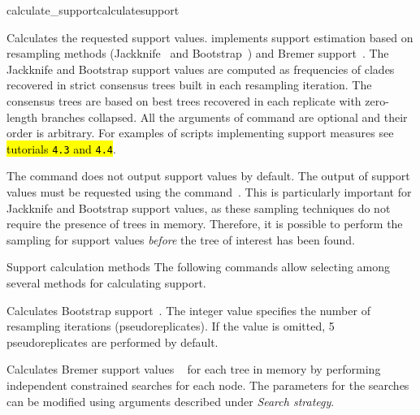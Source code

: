 \begin{command}{calculate\_support}{calculatesupport}


	\begin{poydescription} 
            Calculates the requested support values. \poy implements support
            estimation based on resampling methods (Jackknife~\cite{Farrisetal1996} 
            and Bootstrap~\cite{Felsenstein1985}) and Bremer support~\cite{Bremer1988, Kallersjoetal1992}. 
            The Jackknife and Bootstrap support values are computed as
            frequencies of clades recovered in strict consensus trees built in each resampling
            iteration. The consensus trees are based on best trees recovered in each replicate
            with zero-length branches collapsed.
            All the arguments of  command are optional and
            their order is arbitrary.  For examples of scripts implementing support measures see 
           \hl{ tutorials \texttt{4.3} and \texttt{4.4}}. 
            
	  The  command does not output support values by default. The output of
            support values must be requested using the command~. This is particularly important for Jackknife and Bootstrap support values, as these sampling techniques
            do not require the presence of trees in memory. Therefore, it is possible to perform the sampling for support values \emph{before}
            the tree of interest has been found.
                    \end{poydescription}
                    
              
	\begin{arguments}
		\begin{argumentgroup}{Support calculation methods}
            {The following commands allow selecting among several methods for
            calculating support.} 

                {Calculates Bootstrap support~\cite{Felsenstein1985}. 
                The integer value specifies
                the number of resampling iterations (pseudoreplicates). If the value
                is omitted, 5 pseudoreplicates are performed by default.} 
                {}
                
                {Calculates Bremer support values ~\cite{Bremer1988, Kallersjoetal1992}
                for each tree in memory by performing independent constrained searches for each
                node. The parameters for the searches can be modified using arguments
                described under \emph{Search strategy}.} 
                {}
  

\end{argumentgroup}
\end{arguments}
\end{command}
